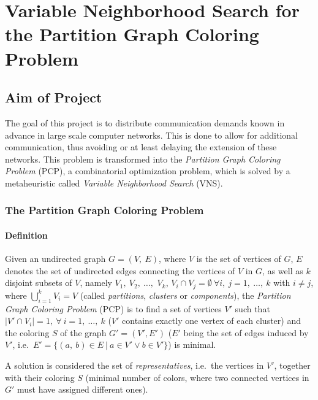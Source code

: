 \documentclass[paper = a4, fontsize = 10pt]{scrartcl}
\begin{document}
\section*{Variable Neighborhood Search for the Partition Graph Coloring Problem}

\subsection*{Aim of Project}

The goal of this project is to distribute communication demands known in advance in large scale computer networks. This is done to allow for additional communication, thus avoiding or at least delaying the extension of these networks. This problem is transformed into the \textit{Partition Graph Coloring Problem} (PCP), a combinatorial optimization problem, which is solved by a metaheuristic called \textit{Variable Neighborhood Search} (VNS).


\subsubsection*{The Partition Graph Coloring Problem}

\paragraph{Definition}
Given an undirected graph $G = (V,\ E)$, where $V$ is the set of vertices of $G$, $E$ denotes the set of undirected edges connecting the vertices of $V$ in $G$, as well as $k$ disjoint subsets of $V$, namely $V_1,\ V_2,\ \ldots,$ $V_k$, $V_i \cap V_j = \emptyset \ \forall i,\ j = 1,\ \ldots,\ k$ with $i \not = j$, where $\bigcup_{i = 1}^k V_i = V$ (called \textit{partitions}, \textit{clusters} or \textit{components}), the \textit{Partition Graph Coloring Problem} (PCP) is to find a set of vertices $V'$ such that $|V' \cap V_i| = 1,\ \forall\ i = 1,\ \ldots,\ k$ ($V'$ contains exactly one vertex of each cluster) and the coloring $S$ of the graph $G' = (V', E')$ ($E'$ being the set of edges induced by $V'$, i.e.\ $E' = \{(a,\ b) \in E\ |\ a \in V' \vee b \in V' \}$) is minimal.

A solution is considered the set of \textit{representatives}, i.e.\ the vertices in $V'$, together with their coloring $S$ (minimal number of colors, where two connected vertices in $G'$ must have assigned different ones).
\end{document}
